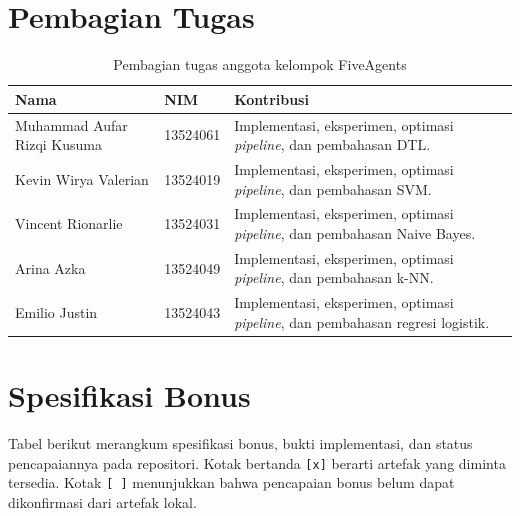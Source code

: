 \section{Pembagian Tugas}

\begin{table}[H]
    \centering
    \begin{tabular}{@{}p{4.6cm}p{2.3cm}p{8.4cm}@{}}
        \toprule
        Nama                        & NIM      & Kontribusi                                                                             \\
        \midrule
        Muhammad Aufar Rizqi Kusuma & 13524061 & Implementasi, eksperimen, optimasi \textit{pipeline}, dan pembahasan DTL.              \\
        Kevin Wirya Valerian        & 13524019 & Implementasi, eksperimen, optimasi \textit{pipeline}, dan pembahasan SVM.              \\
        Vincent Rionarlie           & 13524031 & Implementasi, eksperimen, optimasi \textit{pipeline}, dan pembahasan Naive Bayes.      \\
        Arina Azka                  & 13524049 & Implementasi, eksperimen, optimasi \textit{pipeline}, dan pembahasan k-NN.             \\
        Emilio Justin               & 13524043 & Implementasi, eksperimen, optimasi \textit{pipeline}, dan pembahasan regresi logistik. \\
        \bottomrule
    \end{tabular}
    \caption{Pembagian tugas anggota kelompok FiveAgents}
\end{table}

\section{Spesifikasi Bonus}

Tabel berikut merangkum spesifikasi bonus, bukti implementasi, dan status pencapaiannya pada repositori. Kotak bertanda \texttt{[x]} berarti artefak yang diminta tersedia. Kotak \texttt{[ ]} menunjukkan bahwa pencapaian bonus belum dapat dikonfirmasi dari artefak lokal.

